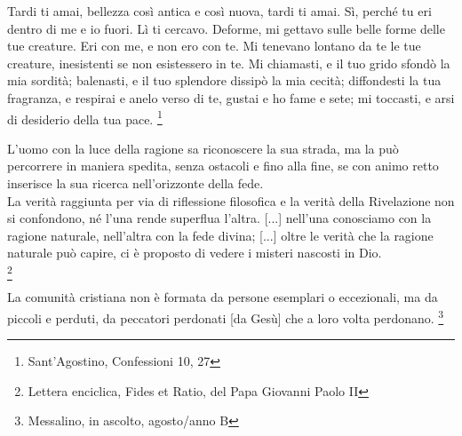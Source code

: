\begin{vcentered}
    Tardi ti amai, bellezza così antica e così nuova, tardi ti amai. Sì, perché tu eri dentro di me e io fuori. Lì ti cercavo. Deforme, mi gettavo sulle belle forme delle tue creature. Eri con me, e non ero con te. Mi tenevano lontano da te le tue creature, inesistenti se non esistessero in te. Mi chiamasti, e il tuo grido sfondò la mia sordità; balenasti, e il tuo splendore dissipò la mia cecità; diffondesti la tua fragranza, e respirai e anelo verso di te, gustai e ho fame e sete; mi toccasti, e arsi di desiderio della tua pace. \footnote{Sant'Agostino, Confessioni 10, 27}
\end{vcentered}

\begin{vcentered}

    L'uomo con la luce della ragione sa riconoscere la sua strada, ma la può percorrere in maniera spedita, senza ostacoli e fino alla fine, se con animo retto inserisce la sua ricerca nell'orizzonte della fede.\\

    La verità raggiunta per via di riflessione filosofica e la verità della Rivelazione non si confondono, né l'una rende superflua l'altra. [...] nell'una conosciamo con la ragione naturale, nell'altra con la fede divina; [...] oltre le verità che la ragione naturale può capire, ci è proposto di vedere i misteri nascosti in Dio.\\

    \footnote{Lettera enciclica, Fides et Ratio, del Papa Giovanni Paolo II}

\end{vcentered}

\begin{vcentered}
    La comunità cristiana non è formata da persone esemplari o eccezionali, ma da piccoli e perduti, da peccatori perdonati [da Gesù] che a loro volta perdonano. \footnote{Messalino, in ascolto, agosto/anno B}
\end{vcentered}

